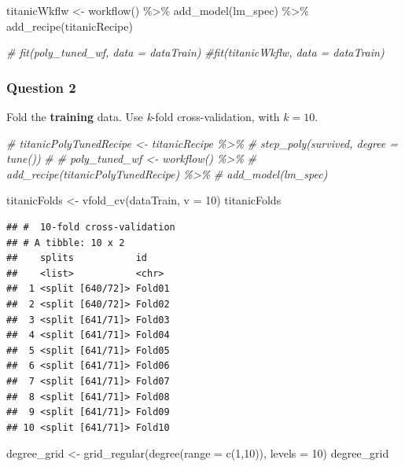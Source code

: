 \documentclass[
]{article}
\newenvironment{Shaded}{\begin{snugshade}}{\end{snugshade}}
\newcommand{\AttributeTok}[1]{\textcolor[rgb]{0.77,0.63,0.00}{#1}}
\newcommand{\CommentTok}[1]{\textcolor[rgb]{0.56,0.35,0.01}{\textit{#1}}}
\newcommand{\DecValTok}[1]{\textcolor[rgb]{0.00,0.00,0.81}{#1}}
\newcommand{\FunctionTok}[1]{\textcolor[rgb]{0.00,0.00,0.00}{#1}}
\newcommand{\NormalTok}[1]{#1}
\newcommand{\OtherTok}[1]{\textcolor[rgb]{0.56,0.35,0.01}{#1}}
\newcommand{\SpecialCharTok}[1]{\textcolor[rgb]{0.00,0.00,0.00}{#1}}
\begin{document}
\begin{Shaded}
\begin{Highlighting}[]
\NormalTok{titanicWkflw }\OtherTok{\textless{}{-}} \FunctionTok{workflow}\NormalTok{() }\SpecialCharTok{\%\textgreater{}\%}
  \FunctionTok{add\_model}\NormalTok{(lm\_spec) }\SpecialCharTok{\%\textgreater{}\%}
  \FunctionTok{add\_recipe}\NormalTok{(titanicRecipe)}
\end{Highlighting}
\end{Shaded}

\begin{Shaded}
\begin{Highlighting}[]
\CommentTok{\# fit(poly\_tuned\_wf, data = dataTrain)}
\CommentTok{\#fit(titanicWkflw, data = dataTrain)}
\end{Highlighting}
\end{Shaded}

\hypertarget{question-2}{%
\subsubsection{Question 2}\label{question-2}}

Fold the \textbf{training} data. Use \emph{k}-fold cross-validation,
with \(k = 10\).

\begin{Shaded}
\begin{Highlighting}[]
\CommentTok{\# titanicPolyTunedRecipe \textless{}{-} titanicRecipe \%\textgreater{}\%}
\CommentTok{\#   step\_poly(survived, degree = tune())}
\CommentTok{\# }
\CommentTok{\# poly\_tuned\_wf \textless{}{-} workflow() \%\textgreater{}\%}
\CommentTok{\#   add\_recipe(titanicPolyTunedRecipe) \%\textgreater{}\%}
\CommentTok{\#   add\_model(lm\_spec)}

\NormalTok{titanicFolds }\OtherTok{\textless{}{-}} \FunctionTok{vfold\_cv}\NormalTok{(dataTrain, }\AttributeTok{v =} \DecValTok{10}\NormalTok{)}
\NormalTok{titanicFolds}
\end{Highlighting}
\end{Shaded}

\begin{verbatim}
## #  10-fold cross-validation 
## # A tibble: 10 x 2
##    splits           id    
##    <list>           <chr> 
##  1 <split [640/72]> Fold01
##  2 <split [640/72]> Fold02
##  3 <split [641/71]> Fold03
##  4 <split [641/71]> Fold04
##  5 <split [641/71]> Fold05
##  6 <split [641/71]> Fold06
##  7 <split [641/71]> Fold07
##  8 <split [641/71]> Fold08
##  9 <split [641/71]> Fold09
## 10 <split [641/71]> Fold10
\end{verbatim}

\begin{Shaded}
\begin{Highlighting}[]
\NormalTok{degree\_grid }\OtherTok{\textless{}{-}} \FunctionTok{grid\_regular}\NormalTok{(}\FunctionTok{degree}\NormalTok{(}\AttributeTok{range =} \FunctionTok{c}\NormalTok{(}\DecValTok{1}\NormalTok{,}\DecValTok{10}\NormalTok{)), }\AttributeTok{levels =} \DecValTok{10}\NormalTok{)}
\NormalTok{degree\_grid}
\end{Highlighting}
\end{Shaded}
\end{document}
